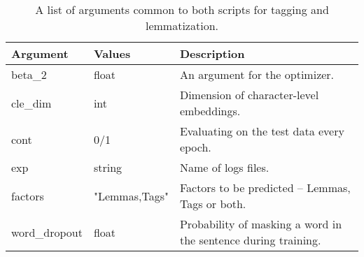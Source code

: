 \begin{table}
\centering
\label{Tab:mt_com_args}
\begin{tabular}{ |p{3cm}|p{}|p{6cm}| } 
 \hline
 Argument & Values & Description \\ 
 \hline \hline
 beta\_2 & float & An argument for the optimizer. \\ \hline
 cle\_dim & int & Dimension of character-level embeddings.  \\ \hline
 cont & 0/1 & Evaluating on the test data every epoch.  \\ \hline
 exp & string & Name of logs files.  \\ \hline
 factors & "Lemmas,Tags" & Factors to be predicted -- Lemmas, Tags or both. \\ \hline
word\_dropout & float & Probability of masking a word in the sentence during training.  \\ \hline

\hline

\end{tabular}
\caption{A list of arguments common to both scripts for tagging and lemmatization.} 
\end{table}


